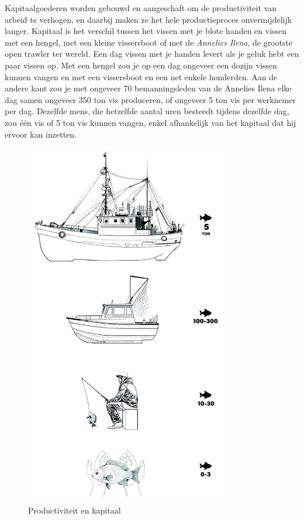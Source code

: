 Kapitaalgoederen worden gebouwd en aangeschaft om de productiviteit van arbeid te verhogen, en daarbij maken ze het hele productieproces onvermijdelijk langer. Kapitaal is het verschil tussen het vissen met je blote handen en vissen met een hengel, met een kleine vissersboot of met de \emph{Annelies Ilena}, de grootste open trawler ter wereld. Een dag vissen met je handen levert als je geluk hebt een paar vissen op. Met een hengel zou je op een dag ongeveer een dozijn vissen kunnen vangen en met een vissersboot en een net enkele honderden. Aan de andere kant zou je met ongeveer 70 bemanningsleden van de Annelies Ilena elke dag samen ongeveer 350 ton vis produceren, of ongeveer 5 ton vis per werknemer per dag. Dezelfde mens, die hetzelfde aantal uren besteedt tijdens dezelfde dag, zou één vis of 5 ton vis kunnen vangen, enkel afhankelijk van het kapitaal dat hij ervoor kan inzetten.

\begin{figure}[]
    \centering
    \includegraphics[width=0.8\textwidth]{figures/fig8.pdf}
    \caption[Productiviteit en kapitaal]{Productiviteit en kapitaal}
    \label{fig8}
\end{figure}

